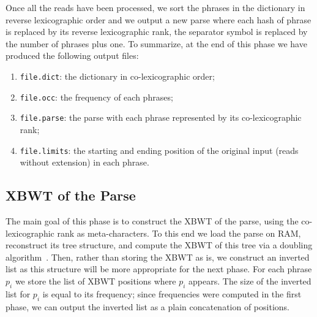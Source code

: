 Once all the reads have been processed, we sort the phrases in the dictionary in reverse lexicographic order and we output a new parse where each hash of phrase is replaced by its reverse lexicographic rank, the separator symbol is replaced by the number of phrases plus one. To summarize, at the end of this phase we have produced the following output files:
\begin{enumerate}
    \item \texttt{file.dict}: the dictionary in co-lexicographic order;
    \item \texttt{file.occ}: the frequency of each phrases;
    \item \texttt{file.parse}: the parse with each phrase represented by its co-lexicographic rank;
    \item \texttt{file.limits}: the starting and ending position of the original input (reads without extension) in each phrase.
\end{enumerate}






\subsection{XBWT of the Parse}

The main goal of this phase is to construct the XBWT of the parse, using the co-lexicographic rank as meta-characters. To this end we load the parse on RAM, reconstruct its tree structure, and compute the XBWT of this tree via a doubling algorithm~\cite{doubling_algorithm}. Then, rather than storing the XBWT as is, we construct an inverted list as this structure will be more appropriate for the next phase. For each phrase $p_i$ we store the list of XBWT positions where $p_i$ appears. The size of the inverted list for $p_i$ is equal to its frequency; since frequencies were computed in the first phase, we can output the inverted list as a plain concatenation of positions.  


